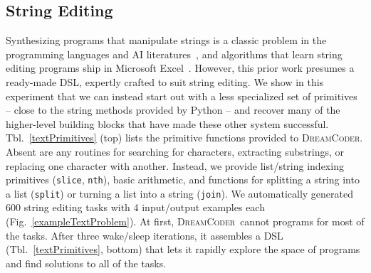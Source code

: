 \documentclass{article}
\newcommand{\system}{\textsc{DreamCoder}~}
\newcommand{\systemEnding}{\textsc{DreamCoder}}
\newcommand{\code}[1]{{\footnotesize\texttt{#1}}}
\begin{document}


\subsection{String Editing}\label{textSection}
Synthesizing programs that manipulate strings is a classic problem in the
programming languages and AI literatures~\cite{menon2013machine,lau2001programming},
and algorithms that learn string editing programs ship in Microsoft Excel~\cite{gulwani2011automating}.
However, this prior work presumes a ready-made DSL,
expertly crafted to suit string editing.
We show in this experiment that we can instead start out with a
less specialized set of primitives -- close to the string methods provided by Python --
and recover many of the higher-level building blocks that have made these
other system successful.
Tbl.~\ref{textPrimitives} (top) lists the primitive functions provided to \systemEnding.
Absent are any routines for searching for characters, extracting substrings,
or replacing one character with another.
Instead, we provide list/string indexing primitives (\code{slice}, \code{nth}),
basic arithmetic, and functions for splitting a string into a list (\code{split})
or turning a list into a string (\code{join}).
We automatically generated  600 string editing tasks  with 4 input/output examples each (Fig.~\ref{exampleTextProblem}). %
At first, \system cannot programs for most of the tasks.
After three wake/sleep iterations,
it assembles a DSL (Tbl.~\ref{textPrimitives}, bottom) that lets it rapidly explore the space of programs and find solutions to
all of the tasks.
\end{document}

